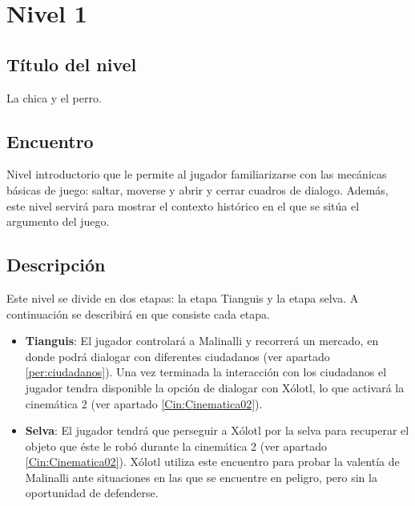 \section{Nivel 1} \label{Nivel:Niv01}
	\subsection{Título del nivel}
	La chica y el perro.
	\subsection{Encuentro}
Nivel introductorio que le permite al jugador familiarizarse con las mecánicas básicas de juego: saltar, moverse y abrir y cerrar cuadros de dialogo. Además, este nivel servirá para mostrar el contexto histórico en el que se sitúa el argumento del juego.
	\subsection{Descripción}
	Este nivel se divide en dos etapas: la etapa Tianguis y la etapa selva. A continuación se describirá en que consiste cada etapa.
	\begin{itemize}
		\item\textbf{Tianguis}: El jugador controlará a Malinalli y recorrerá un mercado, en donde podrá dialogar con diferentes ciudadanos (ver apartado \ref{per:ciudadanos}). Una vez terminada la interacción con los ciudadanos el jugador tendra disponible la opción de
dialogar con Xólotl, lo que activará la cinemática 2 (ver apartado \ref{Cin:Cinematica02}).		
		\item\textbf{Selva}: El jugador tendrá que perseguir a Xólotl por la selva para recuperar el objeto que éste le robó durante la cinemática 2 (ver apartado \ref{Cin:Cinematica02}).  Xólotl utiliza este encuentro para probar la valentía de Malinalli ante situaciones en las que se encuentre en peligro, pero sin la oportunidad de defenderse.    
		
	\end{itemize}

